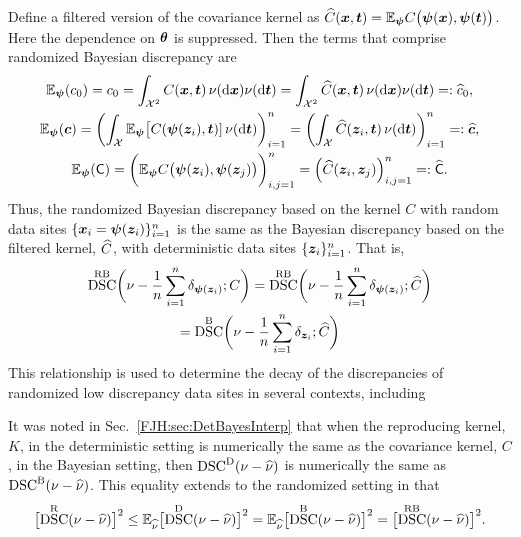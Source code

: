 \documentclass[graybox,footinfo]{svmult}
\DeclareMathOperator{\disc}{DSC}
\begin{document}
Define a filtered version of the covariance kernel as $\widehat{C}({\boldsymbol{x}},{\boldsymbol{t}}) = {\mathbb{E}}_{{\boldsymbol{\psi}}} 
C\bigl({\boldsymbol{\psi}}({\boldsymbol{x}}), {\boldsymbol{\psi}}({\boldsymbol{t}}) \bigr)$.  Here the dependence on ${\boldsymbol{\theta}}$ is 
suppressed.  Then the terms that comprise randomized 
Bayesian discrepancy are
\begin{subequations} \label{FJH:eq:filCvecmatdef}
	\begin{gather}
	 {\mathbb{E}}_{{\boldsymbol{\psi}}}(c_0)  = c_0 =  \int_{{\mathcal{X}}^2} C({\boldsymbol{x}},{\boldsymbol{t}}) \, \nu(\mathrm{d} {\boldsymbol{x}}) \nu(\mathrm{d} 
	 {\boldsymbol{t}}) = 
	 \int_{{\mathcal{X}}^2} \widehat{C}({\boldsymbol{x}},{\boldsymbol{t}}) \, \nu(\mathrm{d} {\boldsymbol{x}}) \nu(\mathrm{d} {\boldsymbol{t}}) =: \widehat{c}_0, \\
	 {\mathbb{E}}_{{\boldsymbol{\psi}}}({\boldsymbol{c}}) = 
	\biggl( \int_{{\mathcal{X}}} 
	{\mathbb{E}}_{{\boldsymbol{\psi}}}\bigl[C({\boldsymbol{\psi}}({\boldsymbol{z}}_i),{\boldsymbol{t}})] \,\nu(\mathrm{d} {\boldsymbol{t}}) \biggr)_{i=1}^n = 
	\biggl( \int_{{\mathcal{X}}} 
	\widehat{C}({\boldsymbol{z}}_i,{\boldsymbol{t}}) \,\nu(\mathrm{d} {\boldsymbol{t}}) \biggr)_{i=1}^n = : \widehat{{\boldsymbol{c}}}, \\
	 {\mathbb{E}}_{{\boldsymbol{\psi}}}(\mathsf{C})  = \biggl(  {\mathbb{E}}_{{\boldsymbol{\psi}}} 
	 C\bigl({\boldsymbol{\psi}}({\boldsymbol{z}}_i), {\boldsymbol{\psi}}({\boldsymbol{z}}_j) \bigr) \biggr)_{i,j=1}^n = \Bigl( \widehat{C}({\boldsymbol{z}}_i,{\boldsymbol{z}}_j) 
	 \Bigr)_{i,j=1}^n =: \widehat{\mathsf{C}}.
	\end{gather}
\end{subequations}
Thus, the randomized Bayesian discrepancy based on the kernel $C$ with random data 
sites $\{{\boldsymbol{x}}_i = {\boldsymbol{\psi}}({\boldsymbol{z}}_i)\}_{i=1}^n$ is the same as the Bayesian discrepancy based 
on the filtered kernel, $\widehat{C}$, with deterministic data sites $\{{\boldsymbol{z}}_i\}_{i=1}^n$.  That is, 
\begin{multline}
\disc^{\Rn\Ba}\biggl(\nu - \frac 1n \sum_{i=1}^n \delta_{\bspsi(\bsz_i)} ; C\biggr) = 
\disc^{\Rn\Ba}\biggl(\nu - \frac 1n \sum_{i=1}^n \delta_{\bspsi(\bsz_i)} ; \filC\biggr) \\
=
\disc^{\Ba}\biggl(\nu - 
\frac 1n \sum_{i=1}^n \delta_{\bsz_i} ; \filC \biggr)
\end{multline}
This relationship is used to determine the decay of the discrepancies of randomized low 
discrepancy data sites in several contexts, including \cite{???}

It was noted in Sec.\ \ref{FJH:sec:DetBayesInterp} that when the reproducing kernel, 
$K$, in the deterministic setting is numerically the same as the covariance kernel, $C$, 
in the Bayesian setting, then $\disc^\Dt(\nu - \hnu)$ is numerically the same as 
$\disc^\Ba(\nu - \hnu)$.  This equality extends to the randomized setting in that 
\begin{equation*}
\bigl[\disc^{\Rn}(\nu - \hnu)\bigr]^2 \le \bbE_{\hnu} \bigl[\disc^\Dt(\nu - \hnu)\bigr]^2 = 
\bbE_{\hnu} \bigl[\disc^\Ba(\nu - 
\hnu)\bigr]^2 = \bigl[\disc^{\Rn\Ba}(\nu - \hnu)\bigr]^2.
\end{equation*}
\end{document}
